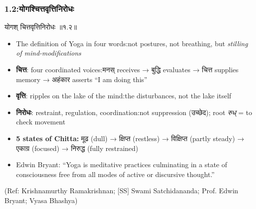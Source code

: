 \begin{frame}[fragile]\frametitle{1.2:योगश्चित्तवृत्तिनिरोधः}

\begin{sanskrit}
योगश् चित्तवृत्तिनिरोधः ॥१.२॥
\end{sanskrit}

\begin{itemize}
\item The definition of Yoga in four words:not postures, not breathing, but \emph{stilling of mind-modifications}
\item \textbf{चित्त}: four coordinated voices:मनस् receives → बुद्धि evaluates → चित्त supplies memory → अहंकार asserts ``I am doing this''
\item \textbf{वृत्ति}: ripples on the lake of the mind:the disturbances, not the lake itself
\item \textbf{निरोधः}: restraint, regulation, coordination:not suppression (उच्छेद); root \emph{रुध्} = to check movement
\item \textbf{5 states of Chitta:} मूढ (dull) → क्षिप्त (restless) → विक्षिप्त (partly steady) → एकाग्र (focused) → निरुद्ध (fully restrained)
\item Edwin Bryant: ``Yoga is meditative practices culminating in a state of consciousness free from all modes of active or discursive thought.''
\end{itemize}

\tiny{(Ref: Krishnamurthy Ramakrishnan; [SS] Swami Satchidananda; Prof. Edwin Bryant; Vyasa Bhashya)}

\end{frame}

